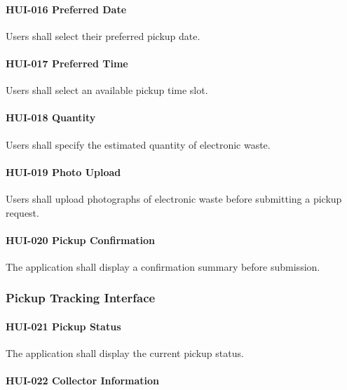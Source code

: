 \paragraph{HUI-016 Preferred Date}

Users shall select their preferred pickup date.

\paragraph{HUI-017 Preferred Time}

Users shall select an available pickup time slot.

\paragraph{HUI-018 Quantity}

Users shall specify the estimated quantity of electronic waste.

\paragraph{HUI-019 Photo Upload}

Users shall upload photographs of electronic waste before submitting a
pickup request.

\paragraph{HUI-020 Pickup Confirmation}

The application shall display a confirmation summary before submission.


\subsubsection*{Pickup Tracking Interface}

\paragraph{HUI-021 Pickup Status}

The application shall display the current pickup status.

\paragraph{HUI-022 Collector Information}


